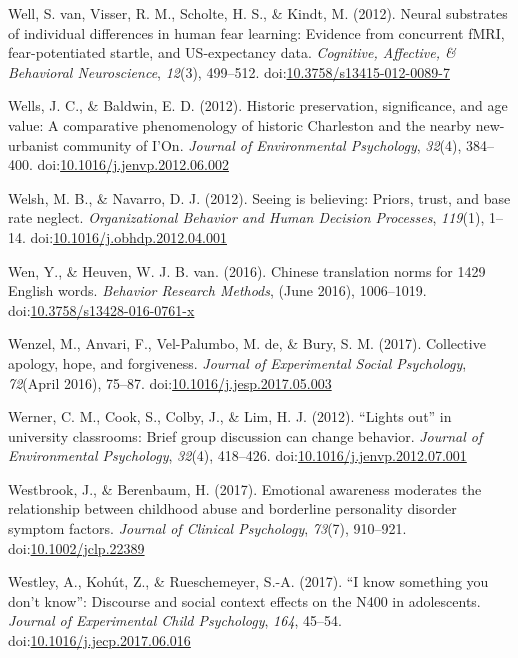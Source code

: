 \documentclass[english,man]{apa6}
\begin{document}
\hypertarget{ref-VanWell2012}{}
Well, S. van, Visser, R. M., Scholte, H. S., \& Kindt, M. (2012). Neural
substrates of individual differences in human fear learning: Evidence
from concurrent fMRI, fear-potentiated startle, and US-expectancy data.
\emph{Cognitive, Affective, \& Behavioral Neuroscience}, \emph{12}(3),
499--512.
doi:\href{https://doi.org/10.3758/s13415-012-0089-7}{10.3758/s13415-012-0089-7}

\hypertarget{ref-Wells2012}{}
Wells, J. C., \& Baldwin, E. D. (2012). Historic preservation,
significance, and age value: A comparative phenomenology of historic
Charleston and the nearby new-urbanist community of I'On. \emph{Journal
of Environmental Psychology}, \emph{32}(4), 384--400.
doi:\href{https://doi.org/10.1016/j.jenvp.2012.06.002}{10.1016/j.jenvp.2012.06.002}

\hypertarget{ref-Welsh2012}{}
Welsh, M. B., \& Navarro, D. J. (2012). Seeing is believing: Priors,
trust, and base rate neglect. \emph{Organizational Behavior and Human
Decision Processes}, \emph{119}(1), 1--14.
doi:\href{https://doi.org/10.1016/j.obhdp.2012.04.001}{10.1016/j.obhdp.2012.04.001}

\hypertarget{ref-Wen2016}{}
Wen, Y., \& Heuven, W. J. B. van. (2016). Chinese translation norms for
1429 English words. \emph{Behavior Research Methods}, (June 2016),
1006--1019.
doi:\href{https://doi.org/10.3758/s13428-016-0761-x}{10.3758/s13428-016-0761-x}

\hypertarget{ref-Wenzel2017}{}
Wenzel, M., Anvari, F., Vel-Palumbo, M. de, \& Bury, S. M. (2017).
Collective apology, hope, and forgiveness. \emph{Journal of Experimental
Social Psychology}, \emph{72}(April 2016), 75--87.
doi:\href{https://doi.org/10.1016/j.jesp.2017.05.003}{10.1016/j.jesp.2017.05.003}

\hypertarget{ref-Werner2012}{}
Werner, C. M., Cook, S., Colby, J., \& Lim, H. J. (2012). ``Lights out''
in university classrooms: Brief group discussion can change behavior.
\emph{Journal of Environmental Psychology}, \emph{32}(4), 418--426.
doi:\href{https://doi.org/10.1016/j.jenvp.2012.07.001}{10.1016/j.jenvp.2012.07.001}

\hypertarget{ref-Westbrook2017}{}
Westbrook, J., \& Berenbaum, H. (2017). Emotional awareness moderates
the relationship between childhood abuse and borderline personality
disorder symptom factors. \emph{Journal of Clinical Psychology},
\emph{73}(7), 910--921.
doi:\href{https://doi.org/10.1002/jclp.22389}{10.1002/jclp.22389}

\hypertarget{ref-Westley2017}{}
Westley, A., Kohút, Z., \& Rueschemeyer, S.-A. (2017). ``I know
something you don't know'': Discourse and social context effects on the
N400 in adolescents. \emph{Journal of Experimental Child Psychology},
\emph{164}, 45--54.
doi:\href{https://doi.org/10.1016/j.jecp.2017.06.016}{10.1016/j.jecp.2017.06.016}
\end{document}
